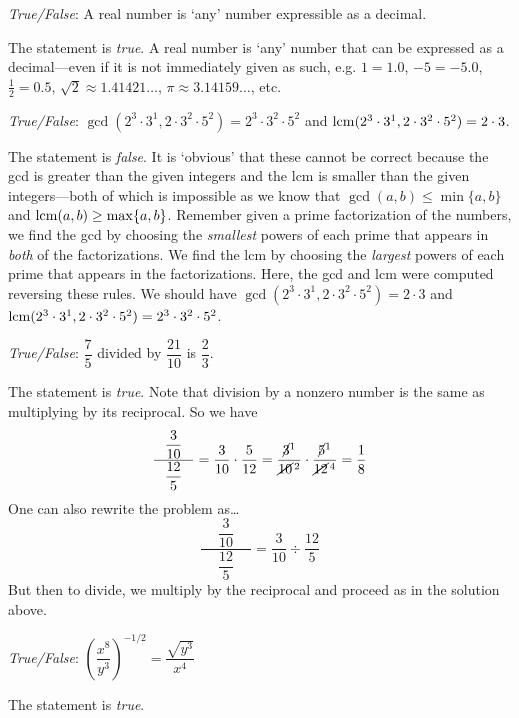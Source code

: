 \documentclass[11pt,letterpaper]{article}
\begin{document}
\thispagestyle{title}

\quizsol \textit{True/False}: A real number is `any' number expressible as a decimal. \pspace

\sol The statement is \textit{true}. A real number is `any' number that can be expressed as a decimal---even if it is not immediately given as such, e.g. $1= 1.0$, $-5= -5.0$, $\frac{1}{2}= 0.5$, $\sqrt{2} \approx 1.41421\ldots$, $\pi \approx 3.14159\ldots$, etc. \pvspace{1.5cm}



\quizsol \textit{True/False}: $\gcd(2^3 \cdot 3^1, 2 \cdot 3^2 \cdot 5^2)= 2^3 \cdot 3^2 \cdot 5^2$ and $\operatorname{lcm}(2^3 \cdot 3^1, 2 \cdot 3^2 \cdot 5^2)= 2 \cdot 3$. \pspace

\sol The statement is \textit{false}. It is `obvious' that these cannot be correct because the gcd is greater than the given integers and the lcm is smaller than the given integers---both of which is impossible as we know that $\gcd(a, b) \leq \min\{a, b\}$ and $\operatorname{lcm}(a, b) \geq \max\{a, b\}$. Remember given a prime factorization of the numbers, we find the gcd by choosing the \textit{smallest} powers of each prime that appears in \textit{both} of the factorizations. We find the lcm by choosing the \textit{largest} powers of each prime that appears in the factorizations. Here, the gcd and lcm were computed reversing these rules. We should have $\gcd(2^3 \cdot 3^1, 2 \cdot 3^2 \cdot 5^2)= 2 \cdot 3$ and $\operatorname{lcm}(2^3 \cdot 3^1, 2 \cdot 3^2 \cdot 5^2)= 2^3 \cdot 3^2 \cdot 5^2$. \pvspace{1.5cm}



\quizsol \textit{True/False}: $\dfrac{7}{5}$ divided by $\dfrac{21}{10}$ is $\dfrac{2}{3}$. \pspace

\sol The statement is \textit{true}. Note that division by a nonzero number is the same as multiplying by its reciprocal. So we have
	\[
	\dfrac{\phantom{-}\dfrac{3}{10}\phantom{-}}{\dfrac{12}{5}}= \dfrac{3}{10} \cdot \dfrac{5}{12}= \dfrac{\cancel{3}^1}{\cancel{10}^{\,2}} \cdot \dfrac{\cancel{5}^1}{\cancel{12}^{\,4}}= \dfrac{1}{8}
	\]
One can also rewrite the problem as\dots 
	\[
	\dfrac{\phantom{-}\dfrac{3}{10}\phantom{-}}{\dfrac{12}{5}}= \dfrac{3}{10} \div \dfrac{12}{5}
	\]
But then to divide, we multiply by the reciprocal and proceed as in the solution above. 


\quizsol \textit{True/False}: $\left( \dfrac{x^8}{y^3} \right)^{-1/2}= \dfrac{\sqrt{y^3}}{x^4}$ \pspace

\sol The statement is \textit{true}. 
\end{document}
